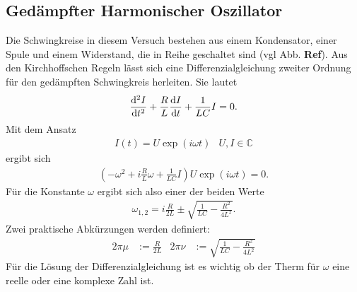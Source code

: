 \subsection{Gedämpfter Harmonischer Oszillator}
Die Schwingkreise in diesem Versuch bestehen aus einem Kondensator, einer Spule und einem Widerstand, 
die in Reihe geschaltet sind (vgl Abb. \textbf{Ref}).
Aus den Kirchhoffschen Regeln lässt sich eine Differenzialgleichung zweiter Ordnung für den gedämpften Schwingkreis herleiten.
Sie lautet
\begin{align}
    \frac{\mathop{}\!\mathrm{d}^2 I}{\mathop{}\!\mathrm{d} t^2}+ \frac{R}{L} \frac{\mathop{}\!\mathrm{d} I}{\mathop{}\!\mathrm{d} t} + \frac{1}{LC}I = 0 . 
    \label{eq:Hom_DGL}
\end{align}
Mit dem Ansatz
\begin{align*}
    I(t) = U \exp(i\omega t) & U, I \in \mathbb{C} 
\end{align*}
ergibt sich
\begin{align*}
    (- \omega^2 + i \frac{R}{L} \omega + \frac{1}{LC}I) U \exp(i\omega t)  = 0 .
\end{align*}
Für die Konstante $\omega$ ergibt sich also einer der beiden Werte
\begin{align*}
    \omega_{1,2} = i \frac{R}{2L} \pm \sqrt{\frac{1}{LC}-\frac{R^2}{4L^2}}.
\end{align*}
Zwei praktische Abkürzungen werden definiert:
\begin{align*}
    2\pi \mu &:= \frac{R}{2L} & 2 \pi \stackrel{~}{\nu} &:=  \sqrt{\frac{1}{LC}-\frac{R^2}{4L^2}}
\end{align*}
Für die Lösung der Differenzialgleichung ist es wichtig ob der Therm für $\omega$ eine reelle oder eine komplexe Zahl ist.

